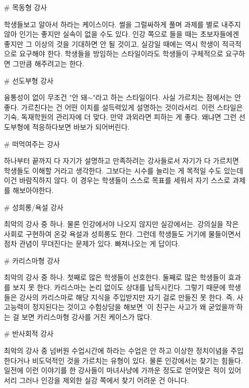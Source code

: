 \begin{itemize}
\item[$\#$]  목동형 강사
\vspace{5mm}

학생들보고 알아서 하라는 케이스이다. 썰을 그럴싸하게 풀며 과제를 별로 내주지 않아 인기는 좋지만 실속이 없을 수도 있다.
인강 쪽으로 들을 때는 초보자들에겐 좋지만 그 이상의 것을 기대하면 안 될 것이고, 실강일 때에는 역시 학생이 적극적으로 요구해야 한다.
학생들을 방임하는 스타일이라도 학생들이 구체적으로 요구하면 그만큼 해주려고는 한다.
\vspace{5mm}

\item[$\#$]  선도부형 강사
\vspace{5mm}

융통성이 없이 무조건 "안 돼$\sim$"라고 하는 스타일이다. 사실 가르치는 점에서는 안 좋다. 가르친다는 건 어떤 이치를 설득력있게 설명하는 것이라서리.
이런 스타일은 기숙, 독재학원의 관리자에 더 맞다.
만약 과외라면 피하는 게 좋다. 왜냐면 그런 선도부형에 적응하다보면 바보가 되어버린다.
\vspace{5mm}

\item[$\#$]  떠먹여주는 강사
\vspace{5mm}

하나부터 끝까지 다 자기가 설명하고 만족하려는 강사들로서 자기가 다 가르치면 학생들도 이해할 거라고 생각한다.
그보다는 시수를 늘리는 게 목적일 수도 있는데 이건 바람직하지 않다. 이 경우는 학생들이 스스로 목표를 세워서 자기 스스로 과제를 해보아야한다.
\vspace{5mm}

\item[$\#$] 성희롱/욕설 강사
\vspace{5mm}

최악의 강사 중 하나. 물론 인강에서야 나오지 않지만 실강에서는.
강의실을 작은 사회로 구현하여 온갖 욕설과 성희롱도 한다. 그런데 학생들도 거기에 물들이면서 점차 관념이 무뎌진다는 문제가 있다.
빠져나오는 게 답이다.
\vspace{5mm}

\item[$\#$] 카리스마형 강사
\vspace{5mm}

최악의 강사 중 하나. 첫째로 많은 학생들이 선호한다. 둘째로 많은 학생들이 효과를 보지 못 한다.
카리스마는 논리 없이도 상대를 납득시킨다. 그렇기 때문에 학생들은 강사의 카리스마로 해당 지식을 주입받지만 자기 걸로 만들진 못 한다.
즉, 사고능력이 정지된다는 것이고 수험상담을 해보면 '이 친구는 사고가 왜 굳었을까'하는 걸 보면 카리스마형 강사를 거친 케이스가 많다.
\vspace{5mm}

\item[$\#$] 반사회적 강사
\vspace{5mm}

최악의 강사 중 넘버원 수업시간에 하라는 수업은 안 하고 이상한 정치이념을 주입한다거나 비도덕적인 것을 가르치는 유형이 있다.
물론 인강에서는 찾기는 힘들다. 일전에 이런 이야기를 한 강사들이 마녀사냥에 가까운 정도로 얻어맞은 적이 있어서리
그러나 인강을 제외한 실강 쪽에서 찾기 어려운 건 아니다.
\vspace{5mm}
\end{itemize}
